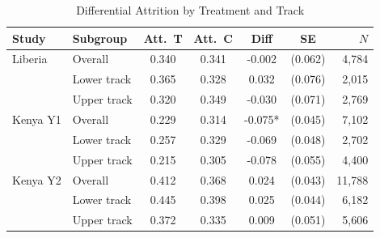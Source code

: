 \begin{table}[htbp]
\centering\small
\caption{Differential Attrition by Treatment and Track}
\label{tab:attrition}
\begin{tabular}{llccccr}
\toprule
Study & Subgroup & Att.\ T & Att.\ C & Diff & SE & $N$ \\
\midrule
Liberia & Overall & 0.340 & 0.341 & -0.002 & (0.062) & 4,784 \\
 & Lower track & 0.365 & 0.328 & 0.032 & (0.076) & 2,015 \\
 & Upper track & 0.320 & 0.349 & -0.030 & (0.071) & 2,769 \\
\addlinespace
Kenya Y1 & Overall & 0.229 & 0.314 & -0.075* & (0.045) & 7,102 \\
 & Lower track & 0.257 & 0.329 & -0.069 & (0.048) & 2,702 \\
 & Upper track & 0.215 & 0.305 & -0.078 & (0.055) & 4,400 \\
\addlinespace
Kenya Y2 & Overall & 0.412 & 0.368 & 0.024 & (0.043) & 11,788 \\
 & Lower track & 0.445 & 0.398 & 0.025 & (0.044) & 6,182 \\
 & Upper track & 0.372 & 0.335 & 0.009 & (0.051) & 5,606 \\
\bottomrule
\end{tabular}
\par\smallskip{}
\end{table}